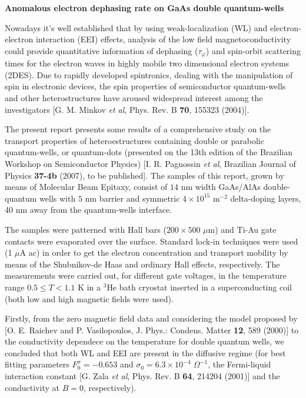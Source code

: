 \documentclass[a4paper,10pt,twocolumn]{memoir}
\newcommand\tauphi{\ensuremath{\tau_\varphi}}
\begin{document}
	\textbf{\large Anomalous electron dephasing rate on GaAs double quantum-wells}

	Nowadays it's well established that by using weak-localization (WL) and electron-electron interaction (EEI) effects, analysis of the low field magnetoconductivity could provide quantitative information of dephasing ($\tauphi$) and spin-orbit scattering times for the electron waves in highly mobile two dimensional electron systems (2DES). Due to rapidly developed spintronics, dealing with the manipulation of spin in electronic devices, the spin properties of semiconductor quantum-wells and other heterostructures have aroused widespread interest among the investigators [G. M. Minkov \textsl{et al}, Phys. Rev. B \textbf{70}, 155323 (2004)].

	The present report presents some results of a comprehensive study on the transport properties of heteroestructures containing double or parabolic quantum-wells, or quantum-dots (presented on the 13th edition of the Brazilian Workshop on Semiconductor Physics) [I. R. Pagnossin \textsl{et al}, Brazilian Journal of Physics \textbf{37-4b} (2007), to be published]. The samples of this report, grown by means of Molecular Beam Epitaxy, consist of $14$ nm width GaAs/AlAs double-quantum wells with $5$ nm barrier and symmetric $4 \times 10^{15}$ m$^{-2}$ delta-doping layers, 40 nm away from the quantum-wells interface.

	The samples were patterned with Hall bars ($200\times 500$ $\mu$m) and Ti-Au gate contacts were evaporated over the surface. Standard lock-in techniques were used (1 $\mu$A ac) in order to get the electron concentration and transport mobility by means of the Shubnikov-de Haas and ordinary Hall effects, respectively. The measurements were carried out, for different gate voltages, in the temperature range $0.5 \le T < 1.1$ K in a $^3$He bath cryostat inserted in a superconducting coil (both low and high magnetic fields were used).

	Firstly, from the zero magnetic field data and considering the model proposed by [O. E. Raichev and P. Vasilopoulos, J. Phys.: Condens. Matter \textbf{12}, 589 (2000)] to the conductivity dependece on the temperature for double quantum wells, we concluded that both WL and EEI are present in the diffusive regime (for best fitting parameters $F_0^\sigma = -0.653$ and $\sigma_0 = 6.3\times 10^{-4}$ $\Omega^{-1}$, the Fermi-liquid interaction constant [G. Zala \textsl{et al}, Phys. Rev. B \textbf{64}, 214204 (2001)] and the conductivity at $B = 0$, respectively).
\end{document}
